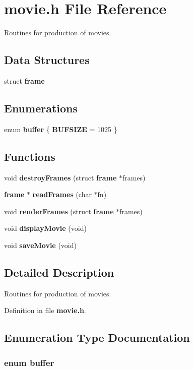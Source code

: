 \section{movie.h File Reference}
\label{movie_8h}
Routines for production of movies.  


\subsection*{Data Structures}
\begin{CompactItemize}
\item 
struct {\bf frame}
\end{CompactItemize}
\subsection*{Enumerations}
\begin{CompactItemize}
\item 
enum {\bf buffer} \{ {\bf BUFSIZE} =  1025
 \}
\end{CompactItemize}
\subsection*{Functions}
\begin{CompactItemize}
\item 
void {\bf destroy\-Frames} (struct {\bf frame} $\ast$frames)
\item 
{\bf frame} $\ast$ {\bf read\-Frames} (char $\ast$fn)
\item 
void {\bf render\-Frames} (struct {\bf frame} $\ast$frames)
\item 
void {\bf display\-Movie} (void)
\item 
void {\bf save\-Movie} (void)
\end{CompactItemize}


\subsection{Detailed Description}
Routines for production of movies. 



Definition in file {\bf movie.h}.

\subsection{Enumeration Type Documentation}
\subsubsection{\setlength{\rightskip}{0pt plus 5cm}enum {\bf buffer}}\label{movie_8h_a6}


